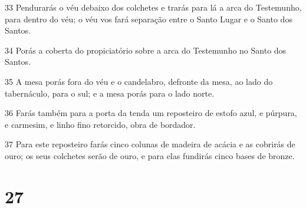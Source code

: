 \par 33 Pendurarás o véu debaixo dos colchetes e trarás para lá a arca do Testemunho, para dentro do véu; o véu vos fará separação entre o Santo Lugar e o Santo dos Santos.
\par 34 Porás a coberta do propiciatório sobre a arca do Testemunho no Santo dos Santos.
\par 35 A mesa porás fora do véu e o candelabro, defronte da mesa, ao lado do tabernáculo, para o sul; e a mesa porás para o lado norte.
\par 36 Farás também para a porta da tenda um reposteiro de estofo azul, e púrpura, e carmesim, e linho fino retorcido, obra de bordador.
\par 37 Para este reposteiro farás cinco colunas de madeira de acácia e as cobrirás de ouro; os seus colchetes serão de ouro, e para elas fundirás cinco bases de bronze.

\chapter{27}


